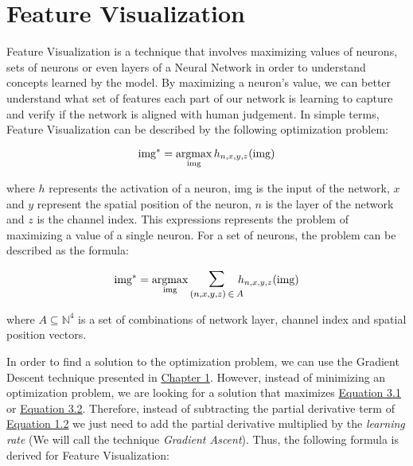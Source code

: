 \chapter{Feature Visualization}

Feature Visualization is a technique that involves maximizing values of neurons, sets of neurons or even layers of a Neural Network in order to understand concepts learned by the model.
By maximizing a neuron's value, we can better understand what set of features each part of our network is learning to capture and verify if the network is aligned with human judgement.
In simple terms, Feature Visualization can be described by the following optimization problem:

\begin{equation}
    \text{img}^* = \operatorname*{argmax}_{\text{img}} h_{n, x, y, z} (\text{img})
    \label{eq:feat_vis_optimization}
\end{equation}

\noindent where \(h\) represents the activation of a neuron, img is the input of the network, \(x\) and \(y\) represent the spatial position of the neuron, \(n\) is the layer of the network and \(z\) is the channel index.
This expressions represents the problem of maximizing a value of a single neuron. For a set of neurons, the problem can be described as the formula:

\begin{equation}
    \text{img}^* =  \argmax_{\text{img}} \mathlarger{\mathlarger{\sum}}_{(n, x, y, z) \: \in \: A} \!\!\! h_{n, x, y, z} (\text{img})
    \label{eq:feat_vis_optimization_multivar}
\end{equation}

where \(A \subseteq \mathbb{N}^4\) is a set of combinations of network layer, channel index and spatial position vectors.

In order to find a solution to the optimization problem, we can use the Gradient Descent technique presented in \hyperref[sec:gradient_descent]{Chapter 1}.
However, instead of minimizing an optimization problem, we are looking for a solution that maximizes \hyperref[eq:feat_vis_optimization]{Equation 3.1} or \hyperref[eq:feat_vis_optimization_multivar]{Equation 3.2}.
Therefore, instead of subtracting the partial derivative term of \hyperref[eq:gradient_descent]{Equation 1.2} we just need to add the partial derivative multiplied by the \emph{learning rate} (We will call the technique \emph{Gradient Ascent}). 
Thus, the following formula is derived for Feature Visualization:

